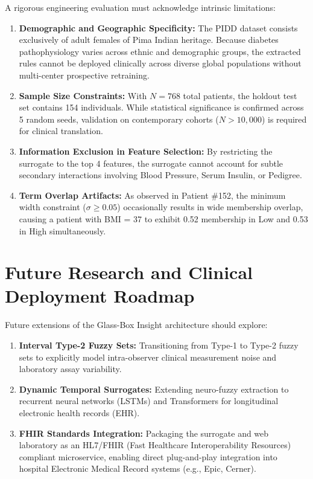 \documentclass{report}
\begin{document}
A rigorous engineering evaluation must acknowledge intrinsic limitations:
\begin{enumerate}
    \setlength{\itemsep}{1pt}
    \setlength{\parskip}{0pt}
    \item \textbf{Demographic and Geographic Specificity:} The PIDD dataset consists exclusively of adult females of Pima Indian heritage. Because diabetes pathophysiology varies across ethnic and demographic groups, the extracted rules cannot be deployed clinically across diverse global populations without multi-center prospective retraining.
    \item \textbf{Sample Size Constraints:} With $N = 768$ total patients, the holdout test set contains 154 individuals. While statistical significance is confirmed across 5 random seeds, validation on contemporary cohorts ($N > 10{,}000$) is required for clinical translation.
    \item \textbf{Information Exclusion in Feature Selection:} By restricting the surrogate to the top 4 features, the surrogate cannot account for subtle secondary interactions involving Blood Pressure, Serum Insulin, or Pedigree.
    \item \textbf{Term Overlap Artifacts:} As observed in Patient \#152, the minimum width constraint ($\sigma \ge 0.05$) occasionally results in wide membership overlap, causing a patient with BMI = 37 to exhibit 0.52 membership in Low and 0.53 in High simultaneously.
\end{enumerate}

\section{Future Research and Clinical Deployment Roadmap}

Future extensions of the Glass-Box Insight architecture should explore:
\begin{enumerate}
    \setlength{\itemsep}{1pt}
    \setlength{\parskip}{0pt}
    \item \textbf{Interval Type-2 Fuzzy Sets:} Transitioning from Type-1 to Type-2 fuzzy sets to explicitly model intra-observer clinical measurement noise and laboratory assay variability.
    \item \textbf{Dynamic Temporal Surrogates:} Extending neuro-fuzzy extraction to recurrent neural networks (LSTMs) and Transformers for longitudinal electronic health records (EHR).
    \item \textbf{FHIR Standards Integration:} Packaging the surrogate and web laboratory as an HL7/FHIR (Fast Healthcare Interoperability Resources) compliant microservice, enabling direct plug-and-play integration into hospital Electronic Medical Record systems (e.g., Epic, Cerner).
\end{enumerate}
\end{document}
